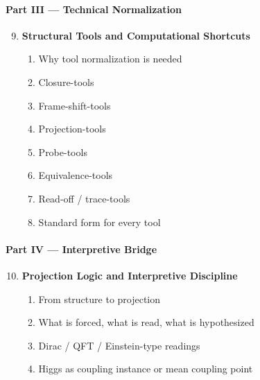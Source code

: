 \paragraph{Part III --- Technical Normalization}
\begin{enumerate}[leftmargin=2em,label=\arabic*.]
  \setcounter{enumi}{8}
  \item \textbf{Structural Tools and Computational Shortcuts}
    \begin{enumerate}[label*=\arabic*., leftmargin=2.5em]
      \item Why tool normalization is needed
      \item Closure-tools
      \item Frame-shift-tools
      \item Projection-tools
      \item Probe-tools
      \item Equivalence-tools
      \item Read-off / trace-tools
      \item Standard form for every tool
    \end{enumerate}
\end{enumerate}

\paragraph{Part IV --- Interpretive Bridge}
\begin{enumerate}[leftmargin=2em,label=\arabic*.]
  \setcounter{enumi}{9}
  \item \textbf{Projection Logic and Interpretive Discipline}
    \begin{enumerate}[label*=\arabic*., leftmargin=2.5em]
      \item From structure to projection
      \item What is forced, what is read, what is hypothesized
      \item Dirac / QFT / Einstein-type readings
      \item Higgs as coupling instance or mean coupling point
    \end{enumerate}
\end{enumerate}

